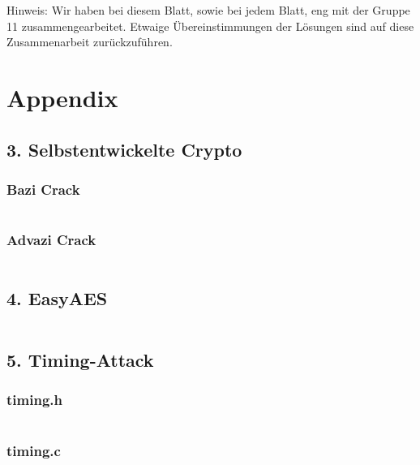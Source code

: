 \documentclass[10pt,a4paper]{article}
\begin{document}
\newpage
Hinweis: Wir haben bei diesem Blatt, sowie bei jedem Blatt, eng mit der Gruppe 11 zusammengearbeitet. Etwaige Übereinstimmungen der Lösungen sind auf diese Zusammenarbeit zurückzuführen.
\setcounter{section}{6}
\section*{Appendix}
\subsection*{3. Selbstentwickelte Crypto}
\subsubsection*{Bazi Crack}
\inputminted{python}{crack_bazi.py}

\newpage

\subsubsection*{Advazi Crack}
\inputminted{python}{crack_advazi.py}

\newpage

\subsection*{4. EasyAES}
\inputminted{C}{EasyAES/mitm.c}

\subsection*{5. Timing-Attack}
\subsubsection*{timing.h}
\inputminted{C}{timingAngriff/timing.h}

\subsubsection*{timing.c}
\inputminted{C}{timingAngriff/timing.c}
\end{document}
